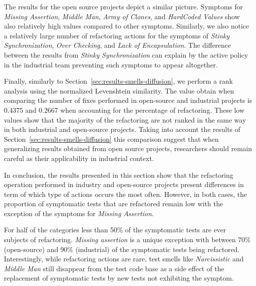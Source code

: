 The results for the open source projects depict a similar picture. Symptoms for \emph{Missing Assertion}, \emph{Middle Man}, \emph{Army of Clones}, and \emph{HardCoded Values} show also relatively high values compared to other symptoms. Similarly, we also notice a relatively large number of refactoring actions for the symptoms of \emph{Stinky Synchronization}, \emph{Over Checking}, and \emph{Lack of Encapsulation}. The difference between the results from \emph{Stinky Synchronization} can explain by the active policy in the industrial team preventing such symptoms to appear altogether.

Finally, similarly to Section~\ref{sec:results-smells-diffusion}, we perform a rank analysis using the normalized Levenshtein similarity. The value obtain when comparing the number of fixes performed in open-source and industrial projects is $0.4375$ and $0.2667$ when accounting for the percentage of refactoring. These low values show that the majority of the refactoring are not ranked in the same way in both industrial and open-source projects. Taking into account the results of Section~\ref{sec:results-smells-diffusion} this comparison suggest that when generalizing results obtained from open source projects, researchers should remain careful as their applicability in industrial context.

In conclusion, the results presented in this section show that the refactoring operation performed in industry and open-source projects present differences in term of which type of actions occurs the most often. However, in both cases, the proportion of symptomatic tests that are refactored remain low with the exception of the symptoms for \emph{Missing Assertion}. 


For half of the categories less than 50\% of the symptomatic tests are ever subjects of refactoring. \emph{Missing assertion} is a unique exception with between 70\% (open-source) and 90\% (industrial) of the symptomatic tests being refactored. Interestingly, while refactoring actions are rare, test smells like \emph{Narcissistic} and \emph{Middle Man} still disappear from the test code base as a side effect of the replacement of symptomatic tests by new tests not exhibiting the symptom.
